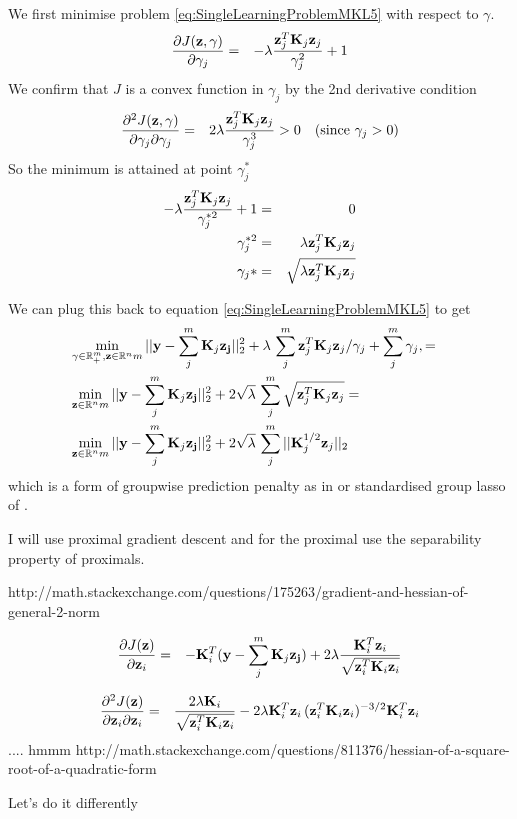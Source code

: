 We first minimise problem \eqref{eq:SingleLearningProblemMKL5} with respect to $\gamma$.
\begin{eqnarray}
\frac{\partial J(\mathbf{z},\mathbf{\gamma})}{\partial \gamma_j}
& = & - \lambda \frac{\mathbf{z}_j^T \mathbf{K}_j \mathbf{z}_j}{\gamma_j^2} + 1
\end{eqnarray}
We confirm that $J$ is a convex function in $\gamma_j$ by the 2nd derivative condition
\begin{eqnarray}
\frac{\partial^2 J(\mathbf{z},\mathbf{\gamma})}{\partial \gamma_j \partial \gamma_j}
& = & 2 \lambda \frac{\mathbf{z}_j^T \mathbf{K}_j \mathbf{z}_j}{\gamma_j^3} > 0 \quad (\text{since } \gamma_j>0)
\end{eqnarray}
So the minimum is attained at point $\gamma_j^*$
\begin{eqnarray}
- \lambda \frac{\mathbf{z}_j^T \mathbf{K}_j \mathbf{z}_j}{\gamma_j^{*2}} + 1 & = & 0 \nonumber \\
\gamma_j^{*2} & = & \lambda \mathbf{z}_j^T \mathbf{K}_j \mathbf{z}_j \nonumber \\
\gamma_j{*} & = & \sqrt{\lambda \mathbf{z}_j^T \mathbf{K}_j \mathbf{z}_j}
\end{eqnarray}

We can plug this back to equation \eqref{eq:SingleLearningProblemMKL5} to get
\begin{eqnarray}\label{eq:SingleLearningProblemMKL6}
& \min_{\gamma \in \mathbb{R}^m_+, \mathbf{z} \in \mathbb{R}^nm} 
||\mathbf{y} - \sum_{j}^m \mathbf{K}_j \mathbf{z_j}||_2^2 +
\lambda \, \sum_{j}^m \mathbf{z}_j^T \mathbf{K}_j \mathbf{z}_j/\gamma_j + \sum_{j}^m \gamma_j, = & \nonumber \\
& \min_{\mathbf{z} \in \mathbb{R}^nm} 
||\mathbf{y} - \sum_{j}^m \mathbf{K}_j \mathbf{z_j}||_2^2 +
2 \sqrt{\lambda} \, \sum_{j}^m \sqrt{\mathbf{z}_j^T \mathbf{K}_j \mathbf{z}_j} = \nonumber \\
& \min_{\mathbf{z} \in \mathbb{R}^nm} 
||\mathbf{y} - \sum_{j}^m \mathbf{K}_j \mathbf{z_j}||_2^2 +
2 \sqrt{\lambda} \, \sum_{j}^m ||\mathbf{K}_j^{1/2} \mathbf{z}_j||_2 &
\end{eqnarray}
which is a form of groupwise prediction penalty as in \cite{Buhlman2013} or standardised group lasso of \cite{Simon2012}.

I will use proximal gradient descent and for the proximal use the separability property of proximals.

http://math.stackexchange.com/questions/175263/gradient-and-hessian-of-general-2-norm


\begin{eqnarray}
\frac{\partial J(\mathbf{z})}{\partial \mathbf{z}_i}
& = & - \mathbf{K}_i^T (\mathbf{y} - \sum_{j}^m \mathbf{K}_j \mathbf{z_j})
+ 2 \lambda \frac{\mathbf{K}^T_i \mathbf{z}_i}{\sqrt{\mathbf{z}_i^T \mathbf{K}_i \mathbf{z}_i}}
\end{eqnarray}

\begin{eqnarray}
\frac{\partial^2 J(\mathbf{z})}{\partial \mathbf{z}_i \partial \mathbf{z}_i}
& = & \frac{2 \lambda \mathbf{K}_i}{\sqrt{\mathbf{z}_i^T \mathbf{K}_i \mathbf{z}_i}} 
- 2 \lambda \mathbf{K}^T_i \mathbf{z}_i \, (\mathbf{z}_i^T \mathbf{K}_i \mathbf{z}_i)^{-3/2} \mathbf{K}^T_i \mathbf{z}_i 
\end{eqnarray}
.... hmmm
http://math.stackexchange.com/questions/811376/hessian-of-a-square-root-of-a-quadratic-form

Let's do it differently